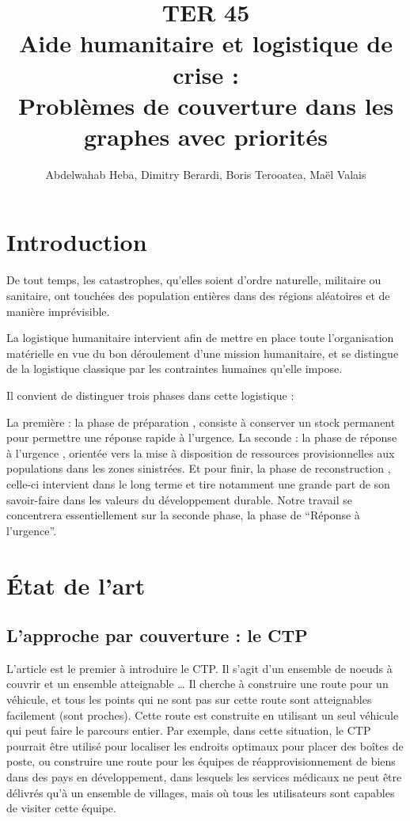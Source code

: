\documentclass[12pt, a4paper, onecolumn, twoside,french,cleardoublepage=plain,openany]{article}
\begin{document}
\title{TER 45 \\ Aide humanitaire et logistique de crise : \\ Problèmes de couverture dans les graphes avec priorités}
\author{Abdelwahab Heba, Dimitry Berardi, Boris Terooatea, Maël Valais}
\maketitle
\tableofcontents

\section{Introduction}\label{introduction}
De tout temps, les catastrophes, qu’elles soient d’ordre naturelle, militaire ou sanitaire, ont touchées des population entières dans des régions aléatoires et de manière imprévisible. 

La logistique humanitaire intervient afin de mettre en place toute l’organisation matérielle en vue du bon déroulement d’une mission humanitaire, et se distingue de la logistique classique par les contraintes humaines qu'elle impose. 

Il convient de distinguer trois phases dans cette logistique :

La première : la phase de préparation , consiste à conserver un stock permanent pour permettre une réponse rapide à l’urgence.
La seconde : la phase de réponse à l'urgence , orientée vers la mise à disposition de ressources provisionnelles aux populations dans les zones sinistrées.
Et pour finir, la phase de reconstruction , celle-ci intervient dans le long terme et tire notamment une grande part de son savoir-faire dans les valeurs du développement durable.
Notre travail se concentrera essentiellement sur la seconde phase, la phase de “Réponse à l’urgence”.

\section{État de l'art}
\subsection{L'approche par couverture : le CTP} \label{CTP}

L’article \cite{gendreau_covering_1997} est le premier à introduire le CTP. Il s’agit d’un ensemble de noeuds à couvrir et un ensemble atteignable … Il cherche à construire une route pour un véhicule, et tous les points qui ne sont pas sur cette route sont atteignables facilement (sont proches). Cette route est construite en utilisant un seul véhicule qui peut faire le parcours entier. Par exemple, dans cette situation, le CTP pourrait être utilisé pour localiser les endroits optimaux pour placer des boîtes de poste, ou construire une route pour les équipes de réapprovisionnement de biens dans des pays en développement, dans lesquels les services médicaux ne peut être délivrés qu’à un ensemble de villages, mais où tous les utilisateurs sont capables de visiter cette équipe.
\end{document}
